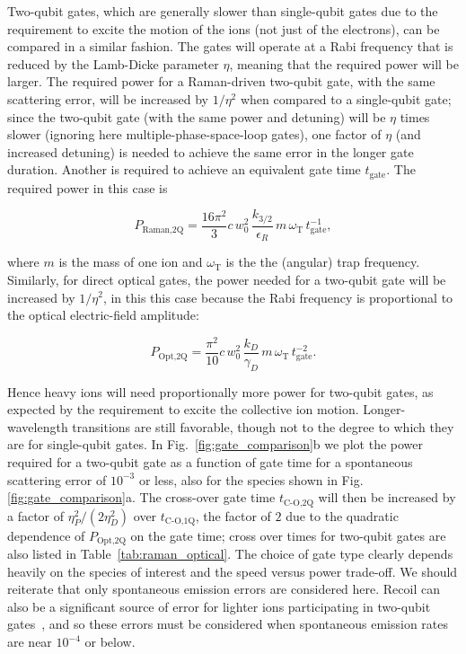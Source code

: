 \documentclass[%
12pt,
 amsmath,amssymb,
]{revtex4-2}
\begin{document}
Two-qubit gates, which are generally slower than single-qubit gates due to the requirement to excite the motion of the ions (not just of the electrons), can be compared in a similar fashion.  The gates will operate at a Rabi frequency that is reduced by the Lamb-Dicke parameter $\eta$, meaning that the required power will be larger.  The required power for a Raman-driven two-qubit gate, with the same scattering error, will be increased by $1/\eta^2$ when compared to a single-qubit gate; since the two-qubit gate (with the same power and detuning) will be $\eta$ times slower (ignoring here multiple-phase-space-loop gates), one factor of $\eta$ (and increased detuning) is needed to achieve the same error in the longer gate duration.  Another is required to achieve an equivalent gate time $t_{\textrm{gate}}$.  The required power in this case is

\begin{equation}
P_{\textrm{Raman,2Q}}=\frac{16\pi^{2}}{3} c\, w_{0}^{2}\, \frac{k_{3/2}}{\epsilon_R}\, m\, \omega_{\textrm{T}}\, t^{-1}_{\textrm{gate}},
\end{equation}

\noindent where $m$ is the mass of one ion and $\omega_{\textrm{T}}$ is the the (angular) trap frequency.  Similarly, for direct optical gates, the power needed for a two-qubit gate will be increased by $1/\eta^{2}$, in this this case because the Rabi frequency is proportional to the optical electric-field amplitude:

 \begin{equation}
P_{\textrm{Opt,2Q}}=\frac{\pi^{2}}{10} c\, w_{0}^{2}\, \frac{k_{D}}{\gamma_{D}}\, m\, \omega_{\textrm{T}}\, t^{-2}_{\textrm{gate}}.
\end{equation}

\noindent Hence heavy ions will need proportionally more power for two-qubit gates, as expected by the requirement to excite the collective ion motion.  Longer-wavelength transitions are still favorable, though not to the degree to which they are for single-qubit gates.  In Fig.~\ref{fig:gate_comparison}b we plot the power required for a two-qubit gate as a function of gate time for a spontaneous scattering error of $10^{-3}$ or less, also for the species shown in Fig. \ref{fig:gate_comparison}a.
The cross-over gate time $t_{\textrm{C-O,2Q}}$ will then be increased by a factor of $\eta_{P}^{2}/(2 \eta_{D}^2)$ over $t_{\textrm{C-O,1Q}}$, the factor of $2$ due to the quadratic dependence of $P_{\textrm{Opt,2Q}}$ on the gate time; cross over times for two-qubit gates are also listed in Table~\ref{tab:raman_optical}.  The choice of gate type clearly depends heavily on the species of interest and the speed versus power trade-off.  We should reiterate that only spontaneous emission errors are considered here.  Recoil can also be a significant source of error for lighter ions participating in two-qubit gates~\cite{PhysRevA.75.042329_2007}, and so these errors must be considered when spontaneous emission rates are near $10^{-4}$ or below.
\end{document}
